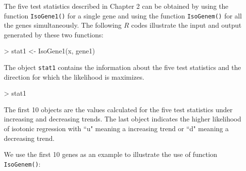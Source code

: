 \documentclass[10pt]{article}
\begin{document}
The five test statistics described in Chapter 2 can be obtained by
using the function \texttt{IsoGene1()} for a single gene and using
the function \texttt{IsoGenem()} for all the genes simultaneously.
The following $R$ codes illustrate the input and output generated by
these two functions:

\begin{Schunk}
\begin{Sinput}
> stat1 <- IsoGene1(x, gene1)
\end{Sinput}
\end{Schunk}

The object \texttt{stat1} contains the information about the five test statistics and the direction for which the likelihood is maximizes.

\begin{Schunk}
\begin{Sinput}
> stat1
\end{Sinput}
\end{Schunk}

The first 10 objects are the values calculated for the five test
statistics under increasing and decreasing trends. The last object
indicates the higher likelihood of isotonic regression with ``u"
meaning a increasing trend or ``d" meaning a decreasing trend.


We use the first 10 genes as an example to illustrate the use of
function \texttt{IsoGenem()}:
\end{document}
